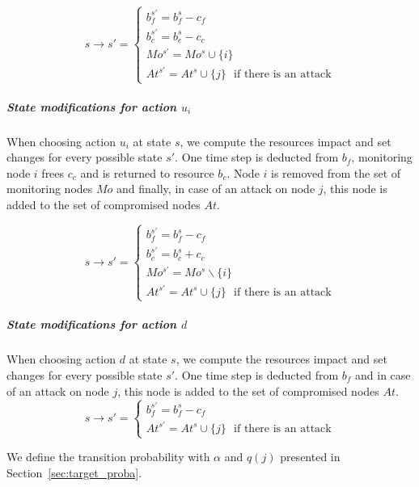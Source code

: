 \begin{equation}
  s \longrightarrow s' =\begin{cases}
    b_f^{s'} = b_f^s - c_f\\
    b_c^{s'} = b_c^s - c_c\\
    Mo^{s'} = Mo^s \cup \{i\}\\
    At^{s'} = At^s \cup \{j\} \text{~~if there is an attack}
  \end{cases}
\end{equation}

\subparagraph*{\textbf{State modifications for action $u_i$}}
When choosing action $u_i$ at state $s$, we compute the resources impact and set changes for every possible state $s'$. One time step is deducted from $b_f$, monitoring node $i$ frees $c_c$ and is returned to resource $b_c$. Node $i$ is removed from the set of monitoring nodes $Mo$ and finally, in case of an attack on node $j$, this node is added to the set of compromised nodes $At$.

\begin{equation}
  s \longrightarrow s' =\begin{cases}
    b_f^{s'} = b_f^s - c_f\\
    b_c^{s'} = b_c^s + c_c\\
    Mo^{s'} = Mo^s \backslash\{i\}\\
    At^{s'} = At^s \cup \{j\}\text{~~if there is an attack}
  \end{cases}
\end{equation}

\subparagraph*{\textbf{State modifications for action $d$}}
When choosing action $d$ at state $s$, we compute the resources impact and set changes for every possible state $s'$. One time step is deducted from $b_f$ and in case of an attack on node $j$, this node is added to the set of compromised nodes $At$.
\begin{equation}
  s \longrightarrow s' =\begin{cases}
    b_f^{s'} = b_f^s - c_f\\
    At^{s'} = At^s \cup \{j\}\text{~~if there is an attack}
  \end{cases}
\end{equation}


We define the transition probability with $\alpha$  and $q(j)$ presented in Section~\ref{sec:target_proba}.

